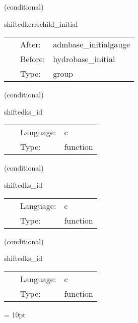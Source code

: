   (conditional) 

\hspace{5mm} shiftedkerrschild\_initial 

\hspace{5mm}{\it schedule shiftedkerrschild initial data group } 


\hspace{5mm}

 \begin{tabular*}{160mm}{cll} 
~ & After:  & admbase\_initialgauge \\ 
~ & Before:  & hydrobase\_initial \\ 
~ & Type:  & group \\ 
\end{tabular*} 


\vspace{5mm}

   (conditional) 

\hspace{5mm} shiftedks\_id 

\hspace{5mm}{\it set up shifted kerr-schild initial data } 


\hspace{5mm}

 \begin{tabular*}{160mm}{cll} 
~ & Language:  & c \\ 
~ & Type:  & function \\ 
\end{tabular*} 


\vspace{5mm}

   (conditional) 

\hspace{5mm} shiftedks\_id 

\hspace{5mm}{\it set up shifted kerr-schild initial data } 


\hspace{5mm}

 \begin{tabular*}{160mm}{cll} 
~ & Language:  & c \\ 
~ & Type:  & function \\ 
\end{tabular*} 


\vspace{5mm}

   (conditional) 

\hspace{5mm} shiftedks\_id 

\hspace{5mm}{\it set up shifted kerr-schild initial data } 


\hspace{5mm}

 \begin{tabular*}{160mm}{cll} 
~ & Language:  & c \\ 
~ & Type:  & function \\ 
\end{tabular*} 



\vspace{5mm}\parskip = 10pt 

